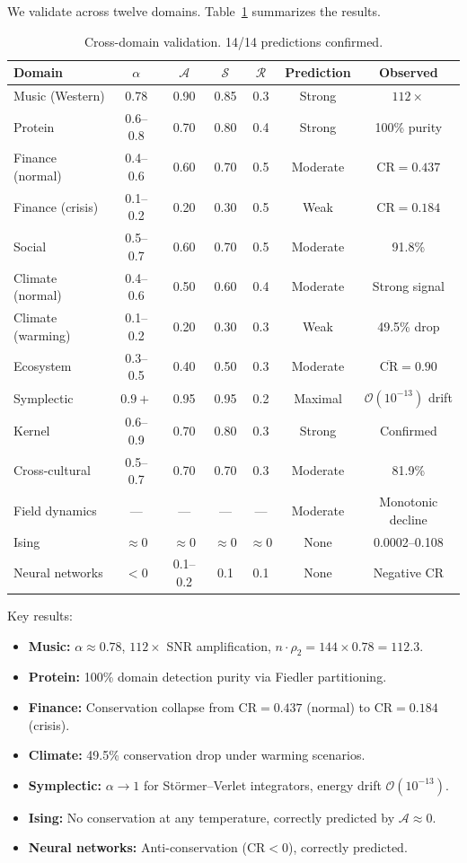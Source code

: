 \documentclass[12pt,letterpaper]{article}
\newcommand{\CR}{\mathrm{CR}}
\newcommand{\cA}{\mathcal{A}}
\newcommand{\cS}{\mathcal{S}}
\newcommand{\cR}{\mathcal{R}}
\newcommand{\cO}{\mathcal{O}}
\begin{document}
We validate across twelve domains. Table~\ref{tab:summary} summarizes the results.

\begin{table}[ht]
\centering
\caption{Cross-domain validation. 14/14 predictions confirmed.}
\label{tab:summary}
\small
\begin{tabular}{lcccccc}
  \toprule
  Domain & $\alpha$ & $\cA$ & $\cS$ & $\cR$ & Prediction & Observed \\
  \midrule
  Music (Western) & 0.78 & 0.90 & 0.85 & 0.3 & Strong & $112\times$ \\
  Protein & 0.6--0.8 & 0.70 & 0.80 & 0.4 & Strong & 100\% purity \\
  Finance (normal) & 0.4--0.6 & 0.60 & 0.70 & 0.5 & Moderate & $\CR = 0.437$ \\
  Finance (crisis) & 0.1--0.2 & 0.20 & 0.30 & 0.5 & Weak & $\CR = 0.184$ \\
  Social & 0.5--0.7 & 0.60 & 0.70 & 0.5 & Moderate & 91.8\% \\
  Climate (normal) & 0.4--0.6 & 0.50 & 0.60 & 0.4 & Moderate & Strong signal \\
  Climate (warming) & 0.1--0.2 & 0.20 & 0.30 & 0.3 & Weak & 49.5\% drop \\
  Ecosystem & 0.3--0.5 & 0.40 & 0.50 & 0.3 & Moderate & $\overline{\CR} = 0.90$ \\
  Symplectic & $0.9+$ & 0.95 & 0.95 & 0.2 & Maximal & $\cO(10^{-13})$ drift \\
  Kernel & 0.6--0.9 & 0.70 & 0.80 & 0.3 & Strong & Confirmed \\
  Cross-cultural & 0.5--0.7 & 0.70 & 0.70 & 0.3 & Moderate & 81.9\% \\
  Field dynamics & --- & --- & --- & --- & Moderate & Monotonic decline \\
  \midrule
  Ising & $\approx 0$ & $\approx 0$ & $\approx 0$ & $\approx 0$ & None & 0.0002--0.108 \\
  Neural networks & $<0$ & 0.1--0.2 & 0.1 & 0.1 & None & Negative $\CR$ \\
  \bottomrule
\end{tabular}
\end{table}

Key results:
\begin{itemize}
  \item \textbf{Music:} $\alpha \approx 0.78$, $112\times$ SNR amplification, $n \cdot \rho_2 = 144 \times 0.78 = 112.3$.
  \item \textbf{Protein:} 100\% domain detection purity via Fiedler partitioning.
  \item \textbf{Finance:} Conservation collapse from $\CR = 0.437$ (normal) to $\CR = 0.184$ (crisis).
  \item \textbf{Climate:} 49.5\% conservation drop under warming scenarios.
  \item \textbf{Symplectic:} $\alpha \to 1$ for St\"ormer--Verlet integrators, energy drift $\cO(10^{-13})$.
  \item \textbf{Ising:} No conservation at any temperature, correctly predicted by $\cA \approx 0$.
  \item \textbf{Neural networks:} Anti-conservation ($\CR < 0$), correctly predicted.
\end{itemize}
\end{document}
